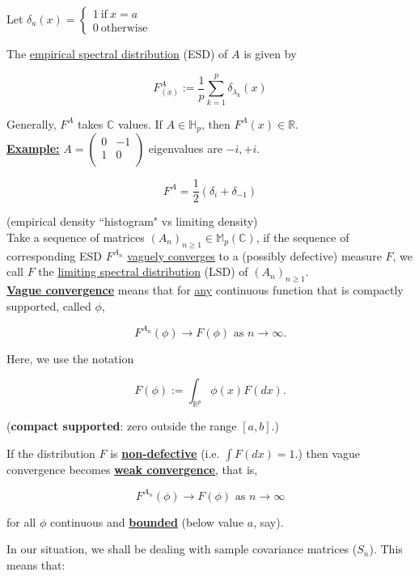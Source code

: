 \documentclass[twoside]{article}
\begin{document}
Let $\delta_a(x)=\begin{cases}
	1\ \text{if}\ x=a\\
	0\ \text{otherwise}
\end{cases}$

The \underline{empirical spectral distribution} (ESD) of $A$ is given by

$$F^A_{(x)}:=\frac{1}{p}\sum^p_{k=1}\delta_{\lambda_k}(x)$$

Generally, $F^A$ takes $\mathbb{C}$ values. If $A\in\mathbb{H}_p$, then $F^A(x)\in\mathbb{R}.$\\

\underline{\textbf{Example:}} $A=\begin{pmatrix}
	0 & -1\\
	1 & 0\\
\end{pmatrix}$ eigenvalues are $-i, +i$.

$$F^A=\frac{1}{2}(\delta_i+\delta_{-1})$$

(empirical density ``histogram" vs limiting density)\\

Take a sequence of matrices $\left(A_n\right)_{n\geq 1}\in\mathbb{M}_p(\mathbb{C})$, if the sequence of corresponding ESD $F^{A_n}$ \underline{vaguely converges} to a (possibly defective) measure $F$, we call $F$ the \underline{limiting spectral distribution} (LSD) of $\left(A_n\right)_{n\geq 1}.$\\

\underline{\textbf{Vague convergence}} means that for \underline{any} continuous function that is compactly supported, called $\phi$,

$$F^{A_n}(\phi)\rightarrow F(\phi)\text{ as } n\rightarrow\infty.$$

Here, we use the notation

$$F(\phi):=\int_{\mathbb{R}^p}\phi(x)F(dx).$$

(\textbf{compact supported}: zero outside the range $[a,b]$.)

If the distribution $F$ is \underline{\textbf{non-defective}} (i.e. $\int F(dx)=1$.) then vague convergence becomes \underline{\textbf{weak convergence}}, that is,

$$F^{A_n}(\phi)\rightarrow F(\phi)\text{ as } n\rightarrow\infty$$

for all $\phi$ continuous and \underline{\textbf{bounded}} (below value $a$, say).

In our situation, we shall be dealing with sample covariance matrices ($S_n$). This means that:
\end{document}
